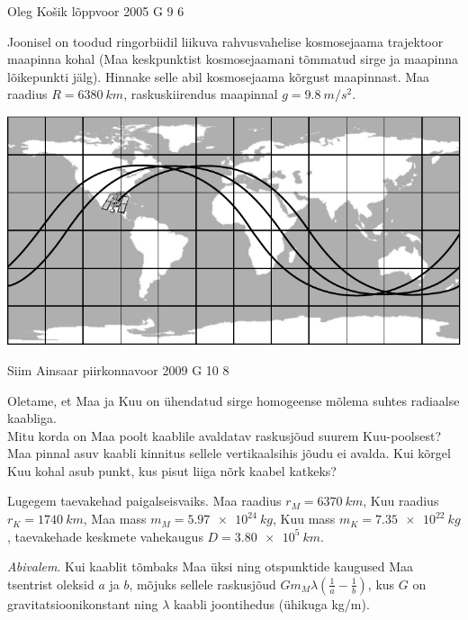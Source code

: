\documentclass[11pt, twoside]{article}
\begin{document}
{%
{Oleg Košik} %
{lõppvoor} %
{2005} %
{G 9} %
{6} %
{
\ifStatement
Joonisel on toodud ringorbiidil liikuva rahvusvahelise kosmosejaama trajektoor maapinna kohal (Maa keskpunktist kosmosejaamani tõmmatud sirge ja maapinna lõikepunkti jälg). Hinnake selle abil kosmosejaama kõrgust maapinnast. Maa raadius $R = \SI{6380}{km}$, raskuskiirendus maapinnal $g = \SI{9,8}{m/s^2}$.

\begin{center}
	\includegraphics[width=\linewidth]{2005-v3g-09-yl}
\end{center}
\fi
}

{Siim Ainsaar} %
{piirkonnavoor} %
{2009} %
{G 10} %
{8} %
{
\ifStatement
Oletame, et Maa ja Kuu on ühendatud sirge homogeense mõlema suhtes radiaalse kaabliga.\\
\osa Mitu korda on Maa poolt kaablile avaldatav ras\-kus\-jõud suurem
Kuu-pool\-sest?\\
\osa Maa pinnal asuv kaabli kinnitus sellele vertikaalsihis jõudu ei avalda.
Kui kõrgel Kuu kohal asub punkt, kus pisut liiga nõrk kaabel katkeks?

Lugegem taevakehad paigalseisvaiks.
Maa raadius $r_M=\SI{6370}{km}$, Kuu raadius $r_K=\SI{1740}{km}$,
Maa mass $m_M=\SI{5,97e24}{kg}$, Kuu mass $m_K=\SI{7,35e22}{kg}$, taevakehade keskmete vahekaugus $D=\SI{3,80e5}{km}$.

\emph{Abivalem}. Kui kaablit tõmbaks Maa üksi ning otspunktide kaugused Maa
tsentrist oleksid $a$ ja $b$, mõjuks sellele raskusjõud $G m_M \lambda
\left( \tfrac1a - \tfrac1b \right)$,
kus $G$ on gravitatsioonikonstant ning $\lambda$ kaabli joontihedus (ühikuga \si{kg/m}).
\fi
}

}
\end{document}
